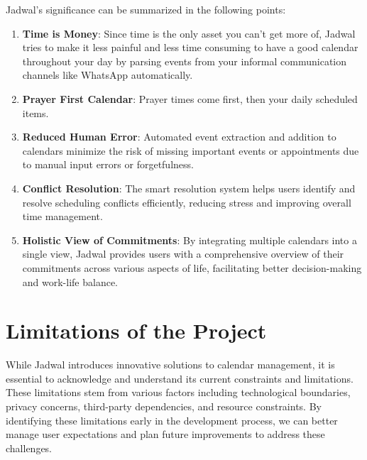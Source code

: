 \documentclass[12pt,a4paper,twoside]{report}
\begin{document}
Jadwal's significance can be summarized in the following points:
\begin{enumerate}
    \item \textbf{Time is Money}: Since time is the only asset you can't get more of, Jadwal tries to make it less painful and less time consuming to have a good calendar throughout your day by parsing events from your informal communication channels like WhatsApp automatically.
    \item \textbf{Prayer First Calendar}: Prayer times come first, then your daily scheduled items.
    \item \textbf{Reduced Human Error}: Automated event extraction and addition to calendars minimize the risk of missing important events or appointments due to manual input errors or forgetfulness.
    \item \textbf{Conflict Resolution}: The smart resolution system helps users identify and resolve scheduling conflicts efficiently, reducing stress and improving overall time management.
    \item \textbf{Holistic View of Commitments}: By integrating multiple calendars into a single view, Jadwal provides users with a comprehensive overview of their commitments across various aspects of life, facilitating better decision-making and work-life balance.
\end{enumerate}

\section{Limitations of the Project}

While Jadwal introduces innovative solutions to calendar management, it is essential to acknowledge and understand its current constraints and limitations. These limitations stem from various factors including technological boundaries, privacy concerns, third-party dependencies, and resource constraints. By identifying these limitations early in the development process, we can better manage user expectations and plan future improvements to address these challenges.
\end{document}
